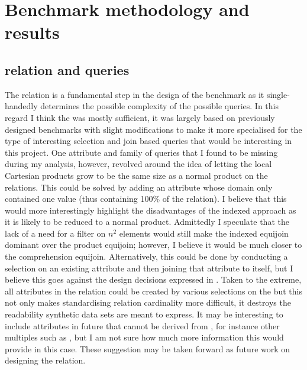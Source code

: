 \section{Benchmark methodology and results}
\subsection{ relation and queries}
The  relation is a fundamental step in the design of
the benchmark as it single-handedly determines the possible complexity of the
possible queries. In this regard I think the  was mostly
sufficient, it was largely based on previously designed benchmarks with slight
modifications to make it more specialised for the type of interesting
selection and join based queries that would be interesting in this project. One
attribute and family of queries that I found to be missing during my analysis,
however, revolved around the idea of letting the local Cartesian products grow
to be the same size as a normal product on the relations. This could be solved
by adding an attribute  whose domain only
contained one value (thus containing 100\% of the relation). I believe that this
would more interestingly highlight the disadvantages of the indexed approach as
it is likely to be reduced to a normal product. Admittedly I speculate that the lack of a need
for a filter on $n^2$ elements would still make the indexed equijoin dominant
over the product equijoin; however, I believe it would be much closer to the
comprehension equijoin. Alternatively, this could be done by conducting a
selection on an existing attribute and then joining that attribute to itself,
but I believe this goes against the design decisions expressed in
. Taken to the extreme, all
attributes in the relation could be created by various selections on the
 but this not only makes standardising relation
cardinality more difficult, it destroys the readability synthetic data sets are
meant to express. It may be interesting to include attributes in future that
cannot be derived from , for instance other
multiples such as , but I am not sure how much more
information this would provide in this case. These suggestion may be taken
forward as future work on designing the  relation.

